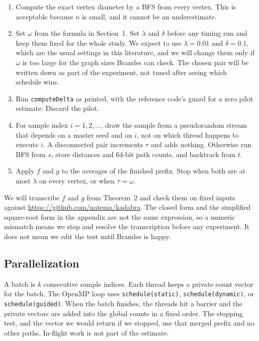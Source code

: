 \documentclass[11pt]{article}
\begin{document}
\begin{enumerate}
\item Compute the exact vertex diameter by a BFS from every vertex. This is acceptable because $n$ is small, and it cannot be an underestimate.
\item Set $\omega$ from the formula in Section~1. Set $\lambda$ and $\delta$ before any timing run and keep them fixed for the whole study. We expect to use $\lambda=0.01$ and $\delta=0.1$, which are the usual settings in this literature, and we will change them only if $\omega$ is too large for the graph sizes Brandes can check. The chosen pair will be written down as part of the experiment, not tuned after seeing which schedule wins.
\item Run \texttt{computeDelta} as printed, with the reference code's guard for a zero pilot estimate. Discard the pilot.
\item For sample index $i=1,2,\ldots$, draw the sample from a pseudorandom stream that depends on a master seed and on $i$, not on which thread happens to execute $i$. A disconnected pair increments $\tau$ and adds nothing. Otherwise run BFS from $s$, store distances and 64-bit path counts, and backtrack from $t$.
\item Apply $f$ and $g$ to the averages of the finished prefix. Stop when both are at most $\lambda$ on every vertex, or when $\tau=\omega$.
\end{enumerate}

We will transcribe $f$ and $g$ from Theorem~2 and check them on fixed inputs against \url{https://github.com/natema/kadabra}. The closed form and the simplified square-root form in the appendix are not the same expression, so a numeric mismatch means we stop and resolve the transcription before any experiment. It does not mean we edit the test until Brandes is happy.

\subsection{Parallelization}

A batch is $k$ consecutive sample indices. Each thread keeps a private count vector for the batch. The OpenMP loop uses \texttt{schedule(static)}, \texttt{schedule(dynamic)}, or \texttt{schedule(guided)}. When the batch finishes, the threads hit a barrier and the private vectors are added into the global counts in a fixed order. The stopping test, and the vector we would return if we stopped, use that merged prefix and no other paths. In-flight work is not part of the estimate.
\end{document}

